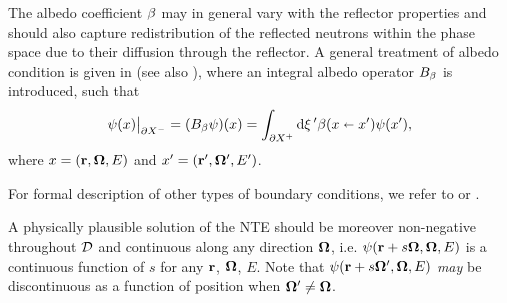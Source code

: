 \begin{remark}
	The albedo coefficient $\albedo$ may in general vary with the reflector properties and should also capture 
	redistribution of the reflected neutrons within the phase space due to their diffusion through the reflector. A general
	treatment of albedo condition is given in \cite{Sanchez4} (see also \cite{Sanchez3}), where an integral albedo operator
	$\albedoop$ is introduced, such that
\begin{equation}\label{eq:albedo-general}
	\angflux(x)\big\vert_{\pX[-]} = (\albedoop\angflux)(x) = \bndint[']{\pX[+]}\albedo(x\sla x')\angflux(x'),
\end{equation}
	where $x = (\br,\bomega,E)$ and $x' = (\br',\bomega',E')$.
\end{remark}
For formal description of other types of boundary conditions, we refer to \cite{Sanchez4} or \cite[Sec. 1.3]{Agoshkov}.

A physically plausible solution of the NTE should be moreover non-negative throughout $\VV$ and continuous along any
direction $\bomega$, i.e. $\psi(\br + s\bomega,\bomega,E)$ is a continuous function of $s$ for any $\br$, $\bomega$, $E$. Note
that $\psi(\br + s\bomega',\bomega,E)$ \textsl{may} be discontinuous as a function of position when $\bomega' \neq
\bomega$.

